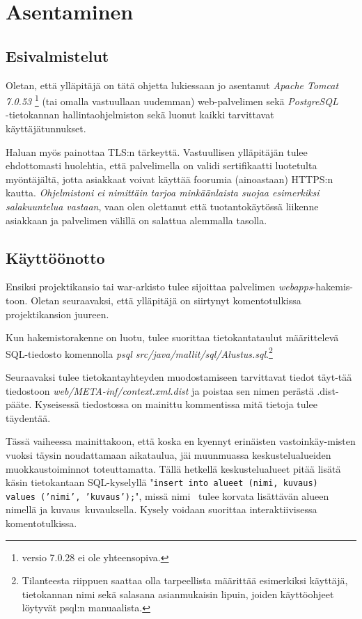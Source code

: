 \documentclass[11pt]{article}
\begin{document}
\newpage
\thispagestyle{plain}
	\section{Asentaminen}
		\subsection{Esivalmistelut}
			Oletan, että ylläpitäjä on tätä ohjetta lukiessaan jo asentanut \emph{Apache Tomcat 7.0.53}
			\footnote{versio 7.0.28 ei ole yhteensopiva.} (tai omalla vastuullaan uudemman) web-palvelimen
			sekä \emph{PostgreSQL}\\ -tietokannan hallintaohjelmiston sekä luonut kaikki tarvittavat
			käyttäjätunnukset.
		
			Haluan myös painottaa TLS:n tärkeyttä. Vastuullisen ylläpitäjän tulee ehdottomasti huolehtia, että
			palvelimella on validi sertifikaatti luotetulta myöntäjältä, jotta asiakkaat voivat käyttää foorumia
			(ainoastaan) HTTPS:n kautta. \emph{Ohjelmistoni ei nimittäin tarjoa minkäänlaista suojaa
			esimerkiksi salakuuntelua vastaan}, vaan olen olettanut että tuotantokäytössä liikenne asiakkaan ja
			palvelimen välillä on salattua alemmalla tasolla.
		
		\subsection{Käyttöönotto}
			Ensiksi projektikansio tai war-arkisto tulee sijoittaa palvelimen \emph{webapps}-hakemis-toon.
			Oletan seuraavaksi, että ylläpitäjä on siirtynyt komentotulkissa projektikansion juureen.
		
			Kun hakemistorakenne on luotu, tulee suorittaa tietokantataulut määrittelevä SQL-tiedosto komennolla
			\emph{psql src/java/mallit/sql/Alustus.sql}.\footnote{Tilanteesta riippuen saattaa olla
			tarpeellista määrittää esimerkiksi käyttäjä, tietokannan nimi sekä salasana asianmukaisin lipuin,
			joiden käyttöohjeet löytyvät psql:n manuaalista.}
		
			Seuraavaksi tulee tietokantayhteyden muodostamiseen tarvittavat tiedot täyt-tää tiedostoon
			\emph{web/META-inf/context.xml.dist} ja poistaa sen nimen perästä .dist-pääte. Kyseisessä
			tiedostossa on mainittu kommentissa mitä tietoja tulee täydentää. 
		
			Tässä vaiheessa mainittakoon, että koska en kyennyt erinäisten vastoinkäy-misten vuoksi täysin
			noudattamaan aikataulua, jäi muunmuassa keskustelualueiden muokkaustoiminnot toteuttamatta.
			Tällä hetkellä keskustelualueet pitää lisätä käsin tietokantaan SQL-kyselyllä "\texttt{insert into
			alueet (nimi, kuvaus)\\ values ('\flq nimi\frq', '\flq kuvaus\frq');}", missä \flq nimi\frq
			\ tulee korvata lisättävän alueen nimellä ja \flq kuvaus\frq \ kuvauksella. Kysely voidaan
			suorittaa interaktiivisessa komentotulkissa.
		
\end{document}
